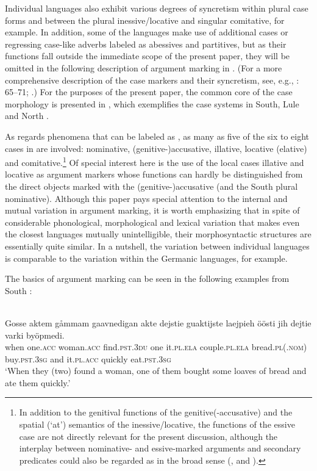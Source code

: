 \documentclass[output=paper]{LSP/langsci}
\begin{document}
Individual  languages also exhibit various degrees of syncretism within plural case forms and between the plural inessive/locative and singular comitative, for example. In addition, some of the languages make use of additional cases or regressing case-like adverbs labeled as abessives and partitives, but as their functions fall outside the immediate scope of the present paper, they will be omitted in the following description of argument marking in . (For a more comprehensive description of the  case markers and their syncretism, see, e.g., \citealt{Sammallahti1998Saami}: 65–71; \citealt{Hansson2007Productive}.) For the purposes of the present paper, the common core of the  case morphology is presented in , which exemplifies the case systems in South, Lule and North .

As regards phenomena that can be labeled as , as many as five of the six to eight cases in  are involved: nominative, (genitive-)accusative, illative, locative (elative) and comitative.\footnote{In addition to the genitival functions of the genitive(-accusative) and the spatial (‘at’) semantics of the inessive/locative, the functions of the essive case are not directly relevant for the present discussion, although the interplay between nominative- and essive-marked arguments and secondary predicates could also be regarded as  in the broad sense (\cf \citealt{Siegl2017Essive,YlikoskiEssive}, and ).} 
Of special interest here is the use of the local cases illative and locative as argument markers whose functions can hardly be distinguished from the direct objects marked with the (genitive-)accusative (and the South  plural nominative). Although this paper pays special attention to the internal and mutual variation in  argument marking, it is worth emphasizing that in spite of considerable phonological, morphological and lexical variation that makes even the closest  languages mutually unintelligible, their morphosyntactic structures are essentially quite similar. In a nutshell, the variation between individual  languages is comparable to the variation within the Germanic languages, for example.

 The basics of  argument marking can be seen in the following examples from South :

\begin{exe}
\ex%
\label{16-ki-ex:4}
\\
\gll Gosse aktem gåmmam gaavnedigan akte dejstie guaktijste laejpieh öösti jih dejtie varki byöpmedi.\\
 when one.\textsc{acc} woman.\textsc{acc} find.\textsc{pst}.\textsc{3du} one it.\textsc{pl}.\textsc{ela} couple.\textsc{pl}.\textsc{ela} bread.\textsc{pl}(.\textsc{nom}) buy.\textsc{pst}.\textsc{3sg} and it.\textsc{pl}.\textsc{acc} quickly eat.\textsc{pst}.\textsc{3sg}\\
\glt ‘When they (two) found a woman, one of them bought some loaves of bread and ate them quickly.’
\end{exe}
\end{document}
